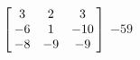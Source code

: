 {$\left[\hskip -3pt \begin{array}{ccc} 3&2&3\\  -6&1&-10
\\  -8&-9&-9\end{array}\hskip -3pt \right]$} 
{$-59$}

  

 

